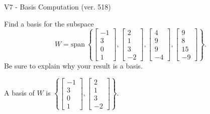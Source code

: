 \begin{exercise}
  \begin{exerciseTitle}V7 - Basis Computation (ver. 518)\end{exerciseTitle}
  \begin{exerciseStatement}
    Find a basis for the subspace 
\[W=\mathrm{span}\ \left\{\left[\begin{array}{r}
-1 \\
3 \\
0 \\
1
\end{array}\right] , \left[\begin{array}{r}
2 \\
1 \\
3 \\
-2
\end{array}\right] , \left[\begin{array}{r}
4 \\
9 \\
9 \\
-4
\end{array}\right] , \left[\begin{array}{r}
9 \\
8 \\
15 \\
-9
\end{array}\right]\right\}.\]
 Be sure to explain why your result is a basis.


  \end{exerciseStatement}
  \begin{exerciseAnswer}
   A basis of \(W\) is  \(\left\{\left[\begin{array}{r}
-1 \\
3 \\
0 \\
1
\end{array}\right] , \left[\begin{array}{r}
2 \\
1 \\
3 \\
-2
\end{array}\right]\right\}\).
  


  \end{exerciseAnswer}
\end{exercise}